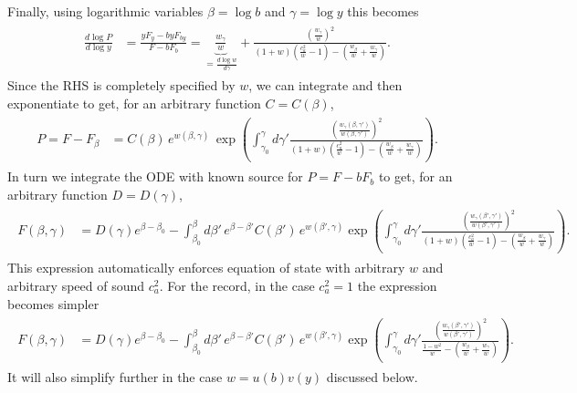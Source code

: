 Finally, using logarithmic variables $\beta=\log b$ and $\gamma=\log y$ this becomes
{\small\begin{align}\label{eq:equation_cs2_manipulated_with_eos}
\begin{aligned}
\frac{d\log P}{d\log y}&= \frac{yF_y-byF_{by}}{F-bF_b}= \underbrace{\tfrac{w_\gamma}{w}}_{=\tfrac{d\log w}{d\gamma}}+ \frac{\left(\tfrac{w_\gamma}{w}\right)^2}{(1+w)\left(\frac{c_a^2}{w}-1\right)-\left(\tfrac{w_\beta}{w}+\tfrac{w_\gamma}{w}\right)}.
\end{aligned}\end{align}}
Since the RHS is completely specified by $w$, we can integrate and then exponentiate to get, for an arbitrary function $C=C(\beta)$,
{\small\begin{align}\begin{aligned}
P=F-F_\beta&= C(\beta) \,e^{w(\beta,\gamma)}\,\exp\left( \int^{\gamma}_{\gamma_0}\!\!\!\!d\gamma'\frac{\left(\tfrac{w_\gamma(\beta,\gamma')}{w(\beta,\gamma')}\right)^2}{(1+w)\left(\frac{c_a^2}{w}-1\right)-\left(\tfrac{w_\beta}{w}+\tfrac{w_\gamma}{w}\right)}\right).
\end{aligned}\end{align}}
In turn we integrate the ODE with known source for $P=F-bF_b$ to get, for an arbitrary function $D=D(\gamma)$,
{\small\begin{align}\begin{aligned}
F(\beta,\gamma)&= D(\gamma)e^{\beta-\beta_0} \!- \!\int_{\beta_0}^\beta\!\!\!\!\!d\beta'\, e^{\beta-\beta'} C(\beta') \,e^{w(\beta',\gamma)}\exp\!\left( \!\int^{\gamma}_{\gamma_0} \!\!\!\!\!d\gamma'\frac{\left(\tfrac{w_\gamma(\beta',\gamma')}{w(\beta',\gamma')}\right)^2}{(1+w)\left(\frac{c_a^2}{w}-1\right)-\left(\tfrac{w_\beta}{w}+\tfrac{w_\gamma}{w}\right)}\!\right).
\end{aligned}\end{align}}
This expression automatically enforces equation of state with arbitrary $w$ and arbitrary speed of sound $c_a^2$.
For the record, in the case $c_a^2=1$ the expression becomes simpler 
{\small\begin{align}\begin{aligned}
F(\beta,\gamma)&= D(\gamma)e^{\beta-\beta_0} \!- \!\int_{\beta_0}^\beta\!\!\!\!\!d\beta'\, e^{\beta-\beta'} C(\beta') \,e^{w(\beta',\gamma)}\exp\!\left( \!\int^{\gamma}_{\gamma_0} \!\!\!\!\!d\gamma'\frac{\left(\tfrac{w_\gamma(\beta',\gamma')}{w(\beta',\gamma')}\right)^2}{\tfrac{1-w^2}{w}-\left(\tfrac{w_\beta}{w}+\tfrac{w_\gamma}{w}\right)}\!\right).
\end{aligned}\end{align}}
It will also simplify further in the case $w=u(b)v(y)$ discussed below.


